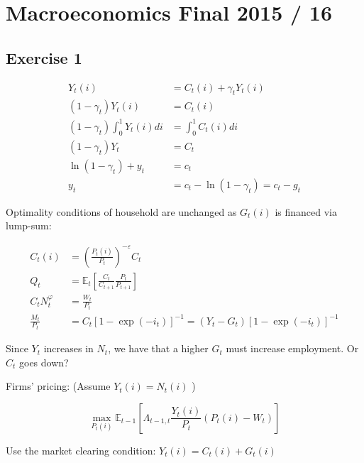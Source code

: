 \section{Macroeconomics Final 2015 / 16}

{
\subsection*{Exercise 1}

\begin{enumerate}[label=(\arabic*)]
{\item 
$$
\begin{aligned}
Y_{t}(i) & =C_{t}(i)+\gamma_{t} Y_{t}(i) \\
\left(1-\gamma_{t}\right) Y_{t}(i) & =C_{t}(i) \\
\left(1-\gamma_{t}\right) \int_{0}^1 Y_{t}(i) d i & =\int_{0}^1 C_{t}(i) d i \\
\left(1-\gamma_{t}\right) Y_{t} & =C_{t} \\
\ln \left(1-\gamma_{t}\right)+y_{t} & =c_{t} \\
y_{t} & =c_{t}-\ln \left(1-\gamma_{t}\right)=c_{t}-g_{t}
\end{aligned}
$$
}
{
\item 

Optimality conditions of household are unchanged as $G_{t}(i)$ is financed via lump-sum:

$$
\begin{aligned}
C_{t}(i) & =\left(\frac{P_{t}(i)}{P_{t}}\right)^{-\varepsilon} C_{t} \\
Q_{t} & =\mathbb{E}_{t}\left[\frac{C_{t}}{C_{t+1}} \frac{P_{t}}{P_{t+1}}\right] \\
C_{t} N_{t}^{\varphi} & =\frac{W_{t}}{P_{t}} \\
\frac{M_{t}}{P_{t}} & =C_{t}\left[1-\exp \left(-i_{t}\right)\right]^{-1}=\left(Y_{t}-G_{t}\right)\left[1-\exp \left(-i_{t}\right)\right]^{-1}
\end{aligned}
$$

Since $Y_{t}$ increases in $N_{t}$, we have that a higher $G_{t}$ must increase employment. \color{red} Or $C_{t}$ goes down? \color{black}

Firms' pricing: (Assume $Y_{t}(i)=N_{t}(i)$ )

$$
\max _{P_{t}(i)} \mathbb{E}_{t-1}\left[\Lambda_{t-1, t} \frac{Y_{t}(i)}{P_{t}}\left(P_{t}(i)-W_{t}\right)\right]
$$

Use the market clearing condition: $Y_{t}(i)=C_{t}(i)+G_{t}(i)$

}
\end{enumerate}}
